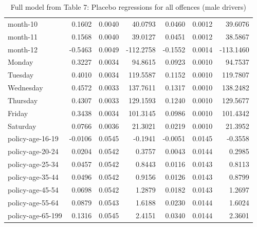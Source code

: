 \documentclass[10pt]{article}
\begin{document}
\begin{table}[ht]
\begin{tabular}{lrrrrrr}
  month-10 & 0.1602 & 0.0040 & 40.0793 & 0.0460 & 0.0012 & 39.6076 \\ 
  month-11 & 0.1568 & 0.0040 & 39.0127 & 0.0451 & 0.0012 & 38.5867 \\ 
  month-12 & -0.5463 & 0.0049 & -112.2758 & -0.1552 & 0.0014 & -113.1460 \\ 
  Monday & 0.3227 & 0.0034 & 94.8615 & 0.0923 & 0.0010 & 94.7537 \\ 
  Tuesday & 0.4010 & 0.0034 & 119.5587 & 0.1152 & 0.0010 & 119.7807 \\ 
  Wednesday & 0.4572 & 0.0033 & 137.7611 & 0.1317 & 0.0010 & 138.2482 \\ 
  Thursday & 0.4307 & 0.0033 & 129.1593 & 0.1240 & 0.0010 & 129.5677 \\ 
  Friday & 0.3438 & 0.0034 & 101.3145 & 0.0986 & 0.0010 & 101.4342 \\ 
  Saturday & 0.0766 & 0.0036 & 21.3021 & 0.0219 & 0.0010 & 21.3952 \\ 
  policy-age-16-19 & -0.0106 & 0.0545 & -0.1941 & -0.0051 & 0.0145 & -0.3558 \\ 
  policy-age-20-24 & 0.0204 & 0.0542 & 0.3757 & 0.0043 & 0.0144 & 0.2985 \\ 
  policy-age-25-34 & 0.0457 & 0.0542 & 0.8443 & 0.0116 & 0.0143 & 0.8113 \\ 
  policy-age-35-44 & 0.0496 & 0.0542 & 0.9156 & 0.0126 & 0.0143 & 0.8799 \\ 
  policy-age-45-54 & 0.0698 & 0.0542 & 1.2879 & 0.0182 & 0.0143 & 1.2697 \\ 
  policy-age-55-64 & 0.0879 & 0.0543 & 1.6188 & 0.0230 & 0.0144 & 1.6024 \\ 
  policy-age-65-199 & 0.1316 & 0.0545 & 2.4151 & 0.0340 & 0.0144 & 2.3601 \\ 
   \hline
\end{tabular}
\caption{Full model from Table 7: Placebo regressions for all offences (male drivers)} 
\label{tab_7_all_pts_with_age_M}
\end{table}


\clearpage
\pagebreak



\end{document}
